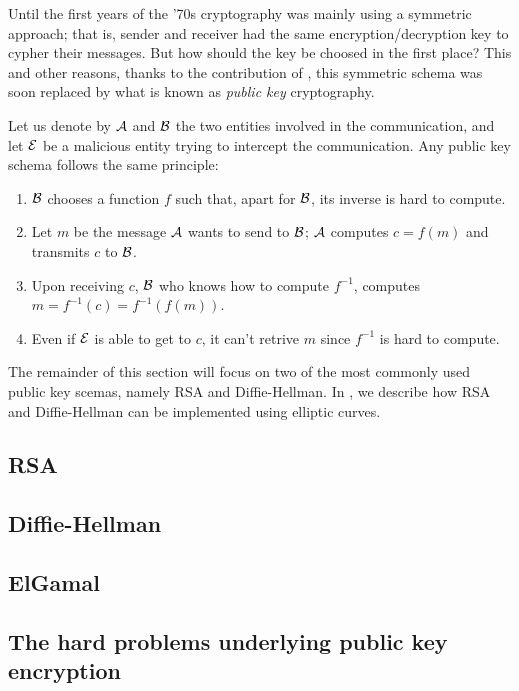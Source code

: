 \documentclass{subfiles}
\begin{document}
    Until the first years of the '70s cryptography was mainly using a symmetric approach;
        that is, sender and receiver had the same encryption/decryption key to cypher their messages.
        But how should the key be choosed in the first place?
        This and other reasons, thanks to the contribution of \citeauthor{DiffieH1976},
        this symmetric schema was soon replaced by what is known as \emph{public key} cryptography.

    Let us denote by \(\operatorname{\mathcal{A}}\) and \(\operatorname{\mathcal{B}}\) the two entities involved in the communication,
        and let \(\operatorname{\mathcal{E}}\) be a malicious entity trying to intercept the communication.
        Any public key schema follows the same principle:
        \begin{enumerate}
            \item \(\operatorname{\mathcal{B}}\) chooses a function \(f\) such that, apart for \(\operatorname{\mathcal{B}}\),
                its inverse is hard to compute.
            \item Let \(m\) be the message \(\operatorname{\mathcal{A}}\) wants to send to \(\operatorname{\mathcal{B}}\);
                \(\operatorname{\mathcal{A}}\) computes \(c = f(m)\) and transmits \(c\) to \(\operatorname{\mathcal{B}}\).
            \item Upon receiving \(c\), \(\operatorname{\mathcal{B}}\) who knows how to compute \(f^{-1}\),
                computes \(m = f^{-1}(c) = f^{-1}(f(m))\).
            \item Even if \(\operatorname{\mathcal{E}}\) is able to get to \(c\), 
                it can't retrive \(m\) since \(f^{-1}\) is hard to compute.
        \end{enumerate}

    The remainder of this section will focus on two of the most commonly used public key scemas,
        namely RSA and Diffie-Hellman. In , we describe 
        how RSA and Diffie-Hellman can be implemented using elliptic curves.

    \subsection{RSA}
    

    \subsection{Diffie-Hellman}
    

    \subsection{ElGamal}
            

    \subsection{The hard problems underlying public key encryption}
    
\end{document}

